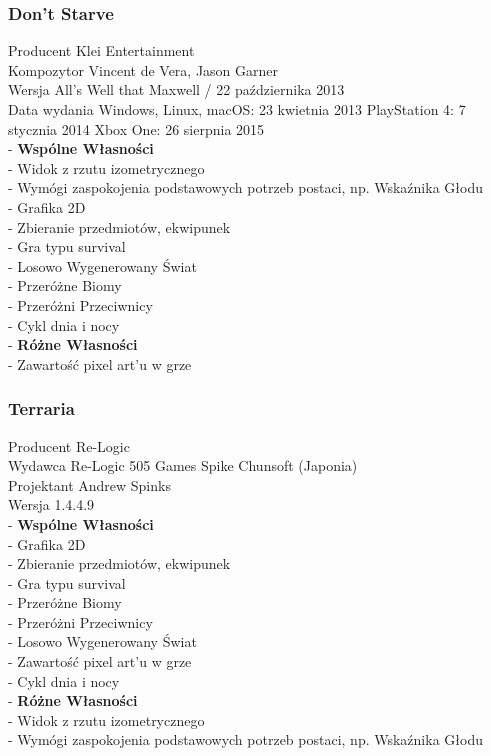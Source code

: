 \documentclass{article}
\begin{document}
\subsubsection{Don't Starve}
Producent	Klei Entertainment\\
Kompozytor	Vincent de Vera, Jason Garner\\
Wersja	All's Well that Maxwell / 22 października 2013\\
Data wydania	Windows, Linux, macOS: 23 kwietnia 2013 PlayStation 4: 7 stycznia 2014 Xbox One: 26 sierpnia 2015\\
- \textbf{Wspólne Własności} \\
- Widok z rzutu izometrycznego\\
- Wymógi zaspokojenia podstawowych potrzeb postaci, np. Wskaźnika Głodu\\
- Grafika 2D\\
- Zbieranie przedmiotów, ekwipunek\\
- Gra typu survival\\
- Losowo Wygenerowany Świat\\
- Przeróżne Biomy\\
- Przeróżni Przeciwnicy\\
- Cykl dnia i nocy\\
- \textbf{Różne Własności} \\
- Zawartość pixel art'u w grze\\
\subsubsection{Terraria}
Producent	Re-Logic\\
Wydawca	Re-Logic 505 Games Spike Chunsoft (Japonia)\\
Projektant	Andrew Spinks\\
Wersja	1.4.4.9\\
- \textbf{Wspólne Własności} \\
- Grafika 2D\\
- Zbieranie przedmiotów, ekwipunek\\
- Gra typu survival\\
- Przeróżne Biomy\\
- Przeróżni Przeciwnicy\\
- Losowo Wygenerowany Świat\\
- Zawartość pixel art'u w grze\\
- Cykl dnia i nocy\\
- \textbf{Różne Własności} \\
- Widok z rzutu izometrycznego\\
- Wymógi zaspokojenia podstawowych potrzeb postaci, np. Wskaźnika Głodu\\
\newpage
\end{document}
